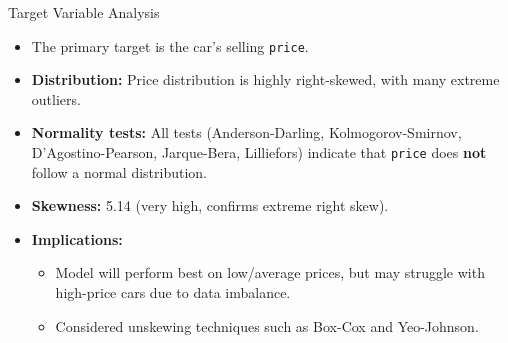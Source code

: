 \documentclass{beamer}
\begin{document}
\begin{frame}{Target Variable Analysis}
        \begin{itemize}
                \item The primary target is the car's selling \texttt{price}.
                \item \textbf{Distribution:} Price distribution is highly
                        right-skewed, with many extreme outliers.
                \item \textbf{Normality tests:} All tests (Anderson-Darling,
                        Kolmogorov-Smirnov, D’Agostino-Pearson, Jarque-Bera,
                        Lilliefors) indicate that \texttt{price} does
                        \textbf{not} follow a normal distribution.
                \item \textbf{Skewness:} 5.14 (very high, confirms extreme
                        right skew).
                \item \textbf{Implications:}
                        \begin{itemize}
                                \item Model will perform best on low/average
                                        prices, but may struggle with
                                        high-price cars due to data imbalance.
                                \item Considered unskewing techniques such as
                                        Box-Cox and Yeo-Johnson.
                        \end{itemize}
        \end{itemize}
\end{frame}
\end{document}
